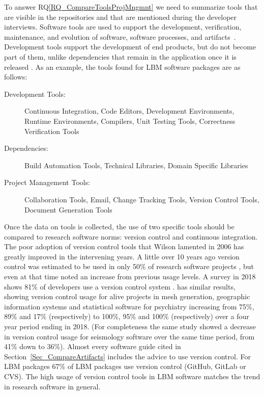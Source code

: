 \documentclass[runningheads]{llncs}
\newcommand{\rqref}[1]{RQ\ref{#1}}
\begin{document}
To answer \rqref{RQ_CompareToolsProjMngmnt} we need to summarize tools that are
visible in the repositories and that are mentioned during the developer
interviews. Software tools are used to support the development, verification,
maintenance, and evolution of software, software processes, and
artifacts~\cite[p.\ 501]{GhezziEtAl2003}. Development tools support the
development of end products, but do not become part of them, unlike dependencies
that remain in the application once it is released \cite[p.\
506]{GhezziEtAl2003}. As an example, the tools found for LBM software packages
are as follows:

\begin{description}
	\item[Development Tools:] Continuous Integration, Code Editors, Development
	Environments, Runtime Environments, Compilers, Unit Testing Tools,
	Correctness Verification Tools
	\item[Dependencies:] Build Automation Tools, Technical Libraries, Domain
	Specific Libraries
	\item[Project Management Tools:] Collaboration Tools, Email, Change Tracking
	Tools, Version Control Tools, Document Generation Tools
\end{description}

Once the data on tools is collected, the use of two specific tools should be
compared to research software norms: version control and continuous integration.
The poor adoption of version control tools that Wilson lamented in 2006
\cite{Wilson2006} has greatly improved in the intervening years.  A little over
10 years ago version control was estimated to be used in only 50\% of research
software projects \cite{Nguyen-HoanEtAl2010}, but even at that time
\cite{Nguyen-HoanEtAl2010} noted an increase from previous usage levels. A
survey in 2018 shows 81\% of developers use a version control system
\cite{AlNoamanyAndBorghi2018}.  \cite{Smith2018} has similar results, showing
version control usage for alive projects in mesh generation, geographic
information systems and statistical software for psychiatry increasing from
75\%, 89\% and 17\% (respectively) to 100\%, 95\% and 100\% (respectively) over
a four year period ending in 2018.  (For completeness the same study showed a
decrease in version control usage for seismology software over the same time
period, from 41\% down to 36\%).  Almost every software guide cited in
Section~\ref{Sec_CompareArtifacts} includes the advice to use version control.
For LBM packages 67\% of LBM packages use version control (GitHub, GitLab or
CVS). The high usage of version control tools in LBM software matches the trend
in research software in general.
\end{document}
